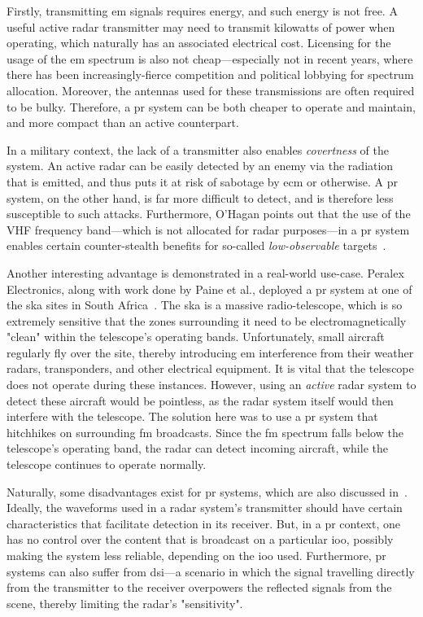 \documentclass[class=report,11pt,crop=false]{standalone}
\begin{document}
Firstly, transmitting \gls{em} signals requires energy, and such energy is not free. A useful active radar transmitter may need to transmit kilowatts of power when operating, which naturally has an associated electrical cost. Licensing for the usage of the \gls{em} spectrum is also not cheap---especially not in recent years, where there has been increasingly-fierce competition and political lobbying for spectrum allocation. Moreover, the antennas used for these transmissions are often required to be bulky. Therefore, a \gls{pr} system can be both cheaper to operate and maintain, and more compact than an active counterpart.

In a military context, the lack of a transmitter also enables \emph{covertness} of the system. An active radar can be easily detected by an enemy via the radiation that is emitted, and thus puts it at risk of sabotage by \gls{ecm} or otherwise. A \gls{pr} system, on the other hand, is far more difficult to detect, and is therefore less susceptible to such attacks. Furthermore, O'Hagan points out that the use of the VHF frequency band---which is not allocated for radar purposes---in a \gls{pr} system enables certain counter-stealth benefits for so-called \emph{low-observable} targets~\cite{o2009passive}.

Another interesting advantage is demonstrated in a real-world use-case. Peralex Electronics, along with work done by Paine et al., deployed a \gls{pr} system at one of the \gls{ska} sites in South Africa~\cite{Paine2018}. The \gls{ska} is a massive radio-telescope, which is so extremely sensitive that the zones surrounding it need to be electromagnetically "clean" within the telescope's operating bands. Unfortunately, small aircraft regularly fly over the site, thereby introducing \gls{em} interference from their weather radars, transponders, and other electrical equipment. It is vital that the telescope does not operate during these instances. However, using an \emph{active} radar system to detect these aircraft would be pointless, as the radar system itself would then interfere with the telescope. The solution here was to use a \gls{pr} system that hitchhikes on surrounding \gls{fm} broadcasts. Since the \gls{fm} spectrum falls below the telescope's operating band, the radar can detect incoming aircraft, while the telescope continues to operate normally.

Naturally, some disadvantages exist for \gls{pr} systems, which are also discussed in~\cite{o2009passive}. Ideally, the waveforms used in a radar system's transmitter should have certain characteristics that facilitate detection in its receiver. But, in a \gls{pr} context, one has no control over the content that is broadcast on a particular \gls{ioo}, possibly making the system less reliable, depending on the \gls{ioo} used. Furthermore, \gls{pr} systems can also suffer from \gls{dsi}---a scenario in which the signal travelling directly from the transmitter to the receiver overpowers the reflected signals from the scene, thereby limiting the radar's "sensitivity".
\end{document}
